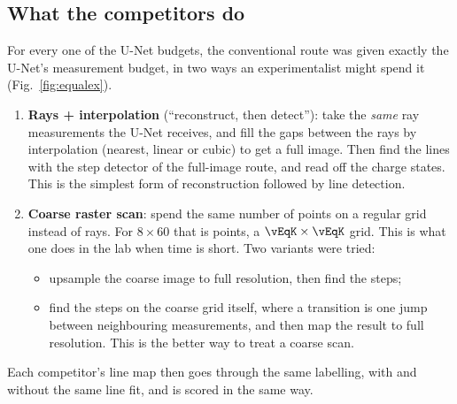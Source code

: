 \documentclass[10pt,a4paper]{article}
\begin{document}
\subsection{What the competitors do}
For every one of the \vEqNBud{} U-Net budgets, the conventional route was
given exactly the U-Net's measurement budget, in two ways an experimentalist
might spend it (Fig.~\ref{fig:equalex}).
\begin{enumerate}
\item \textbf{Rays + interpolation} (``reconstruct, then detect''): take the
  \emph{same} ray measurements the U-Net receives, and fill the gaps between
  the rays by interpolation (nearest, linear or cubic) to get a full image.
  Then find the lines with the step detector of the full-image route, and
  read off the charge states.  This is the simplest form of reconstruction
  followed by line detection.
\item \textbf{Coarse raster scan}: spend the same number of points on a
  regular grid instead of rays.  For $8\times60$ that is \vEqNPts{} points,
  a $\vEqK\times\vEqK$ grid.  This is what one does in the lab when time is
  short.  Two variants were tried:
  \begin{itemize}
  \item upsample the coarse image to full resolution, then find the steps;
  \item find the steps on the coarse grid itself, where a transition is one
    jump between neighbouring measurements, and then map the result to full
    resolution.  This is the better way to treat a coarse scan.
  \end{itemize}
\end{enumerate}
Each competitor's line map then goes through the same labelling, with and
without the same line fit, and is scored in the same way.
\end{document}
